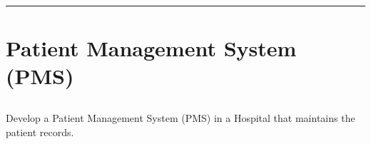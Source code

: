 \documentclass[12pt,letterpaper]{article}
\begin{document}
\hrule
\newpage

\section*{Patient Management System (PMS)}
\subsection*{}
\begin{flushleft}
    Develop  a  Patient  Management  System (PMS) in  a  Hospital  that  maintains  the patient records.
\end{flushleft}

\subsection*{}
\subsubsection*{}
\subsubsection*{}
\begin{flushleft}

\end{flushleft}

\subsubsection*{{}}
\begin{flushleft}
    
\end{flushleft}

\subsubsection*{{}}
\begin{flushleft}
    
\end{flushleft}

\subsubsection*{}
\subsubsection*{}
\begin{flushleft}

\end{flushleft}
\end{document}
